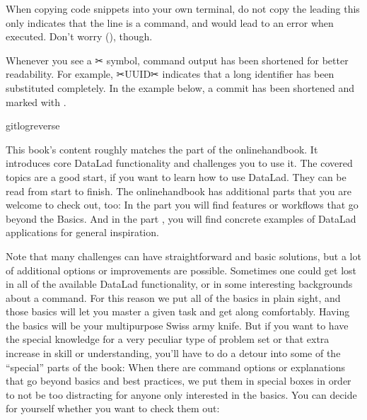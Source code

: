 \sphinxAtStartPar
When copying code snippets into your own terminal, do not copy the leading
\sphinxcode{\sphinxupquote{\$}} \textemdash{} this only indicates that the line is a command, and would lead to an
error when executed.
Don’t worry {\hyperref[\detokenize{intro/narrative:fom-lazy}]{}} (), though.

\sphinxAtStartPar
Whenever you see a ✂ symbol, command output has been shortened for better readability.
For example, ✂UUID✂ indicates that a long {\hyperref[\detokenize{glossary:UUID}]{}} identifier has been substituted completely.
In the example below, a commit {\hyperref[\detokenize{glossary:term-shasum}]{}} has been shortened and marked with .

\begin{sphinxVerbatim}[commandchars=\\\{\}]
gitlog\PYGZhy{}\PYGZhy{}reverse
\end{sphinxVerbatim}

\sphinxAtStartPar
This book’s content roughly matches the  part of the online\sphinxhyphen{}handbook.
It introduces core DataLad functionality and challenges you to use it.
The covered topics are a good start, if you want to learn how to use DataLad.
They can be read from start to finish.
The online\sphinxhyphen{}handbook has additional parts that you are welcome to check
out, too:
In the  part you will find features or workflows that go beyond the
Basics.
And in the part , you will find concrete examples of
DataLad applications for general inspiration.

\sphinxAtStartPar
Note that many challenges can have straightforward and basic solutions,
but a lot of additional options or improvements are possible.
Sometimes one could get lost in all of the available DataLad functionality,
or in some interesting backgrounds about a command.
For this reason we put all of the basics in plain sight, and those basics
will let you master a given task and get along comfortably.
Having the basics will be your multi\sphinxhyphen{}purpose Swiss army knife.
But if you want to have the special knowledge for a very peculiar type
of problem set or that extra increase in skill or understanding,
you’ll have to do a detour into some of the “special” parts of the book:
When there are command options or explanations that go beyond basics and
best practices, we put them in special boxes in order
to not be too distracting for anyone only interested in the basics.
You can decide for yourself whether you want to check them out:

